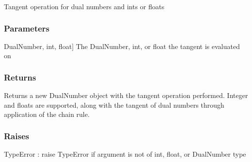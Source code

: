 \documentclass[letterpaper,10pt,english]{sphinxmanual}
\begin{document}
\begin{fulllineitems}
\label{\detokenize{autodiff:autodiff.operators.tan}}
\pysigstartsignatures
{}
\pysigstopsignatures
\sphinxAtStartPar
Tangent operation for dual numbers and ints or floats


\subsubsection{Parameters}
\label{\detokenize{autodiff:id42}}\begin{description}
\sphinxlineitem{x}{[}DualNumber, int, float{]}
\sphinxAtStartPar
The DualNumber, int, or float the tangent is evaluated on

\end{description}


\subsubsection{Returns}
\label{\detokenize{autodiff:id43}}\begin{description}
\sphinxAtStartPar
Returns a new DualNumber object with the tangent operation performed. Integer and
floats are supported, along with the tangent of dual numbers through application 
of the chain rule.

\end{description}


\subsubsection{Raises}
\label{\detokenize{autodiff:id44}}
\sphinxAtStartPar
TypeError : raise TypeError if argument is not of int, float, or DualNumber type

\end{fulllineitems}

\end{document}
